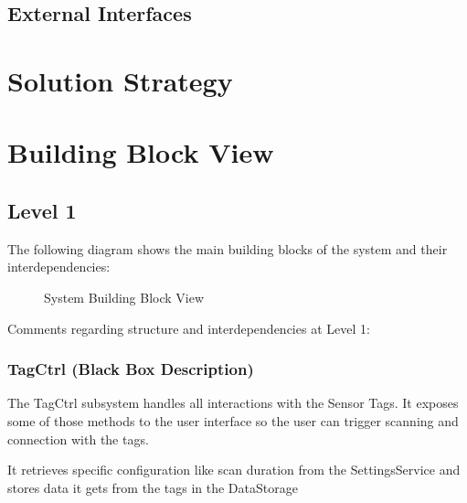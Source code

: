 \documentclass[]{article}
\begin{document}
\subsection{External Interfaces}

\section{Solution Strategy}

\section{Building Block View}

\subsection{Level 1}

The following diagram shows the main building blocks of the system and
their interdependencies:
\begin{figure}
\center
{}
\caption{System Building Block View}
\end{figure}
Comments regarding structure and interdependencies at Level 1:

\subsubsection{TagCtrl (Black Box Description)}

The TagCtrl subsystem handles all interactions with the Sensor Tags. It exposes some of those methods to the user interface so the user can trigger scanning and connection with the tags. 

It retrieves specific configuration like scan duration from the SettingsService and stores data it gets from the tags in the DataStorage 
\end{document}
